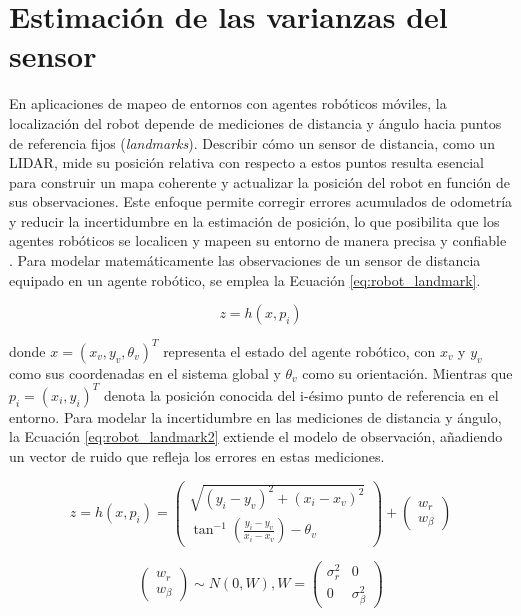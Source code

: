 \section{Estimación de las varianzas del sensor }
\label{sec:estimacion}
En aplicaciones de mapeo de entornos con agentes robóticos móviles, la localización del robot depende de mediciones de distancia y ángulo hacia puntos de referencia fijos (\textit{landmarks}). Describir cómo un sensor de distancia, como un LIDAR, mide su posición relativa con respecto a estos puntos resulta esencial para construir un mapa coherente y actualizar la posición del robot en función de sus observaciones. Este enfoque permite corregir errores acumulados de odometría y reducir la incertidumbre en la estimación de posición, lo que posibilita que los agentes robóticos se localicen y mapeen su entorno de manera precisa y confiable \cite{corke_robotics_2017}. Para modelar matemáticamente las observaciones de un sensor de distancia equipado en un agente robótico, se emplea la Ecuación \eqref{eq:robot_landmark}.

\begin{equation}
	\label{eq:robot_landmark}
	z = h(x,p_i) 
\end{equation}

donde $x = (x_v, y_v, \theta_v)^T$ representa el estado del agente robótico, con $x_v$ y $y_v$ como sus coordenadas en el sistema global y $\theta_v$ como su orientación. Mientras que $p_i = (x_i, y_i)^T$ denota la posición conocida del i-ésimo punto de referencia en el entorno. Para modelar la incertidumbre en las mediciones de distancia y ángulo, la Ecuación \eqref{eq:robot_landmark2} extiende el modelo de observación, añadiendo un vector de ruido que refleja los errores en estas mediciones.

\begin{equation}
	\label{eq:robot_landmark2}
	z = h(x, p_i) =
	\begin{pmatrix}
		\sqrt{(y_i - y_v)^2 + (x_i - x_v)^2} \\
		\tan^{-1}\left(\frac{y_i - y_v}{x_i - x_v}\right) - \theta_v
	\end{pmatrix}
	+
	\begin{pmatrix}
		w_r \\
		w_\beta
	\end{pmatrix}
\end{equation}

\begin{equation}
	\label{eq:matriz_covarianza}
	\begin{pmatrix}
		w_r \\
		w_\beta
	\end{pmatrix}
	\sim
	N(0,W),	W =
	\begin{pmatrix}
		\sigma_r^2 & 0 \\
		0 & \sigma_\beta^2
	\end{pmatrix}
\end{equation}

